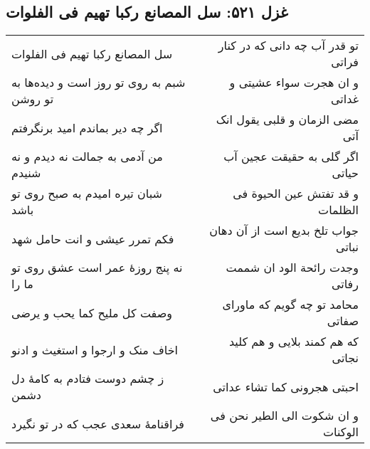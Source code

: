 \begin{center}
\section*{غزل ۵۲۱: سل المصانع رکبا تهیم فی الفلوات}
\label{sec:521}
\begin{longtable}{l p{0.5cm} r}
سل المصانع رکبا تهیم فی الفلوات
&&
تو قدر آب چه دانی که در کنار فراتی
\\
شبم به روی تو روز است و دیده‌ها به تو روشن
&&
و ان هجرت سواء عشیتی و غداتی
\\
اگر چه دیر بماندم امید برنگرفتم
&&
مضی الزمان و قلبی یقول انک آتی
\\
من آدمی به جمالت نه دیدم و نه شنیدم
&&
اگر گلی به حقیقت عجین آب حیاتی
\\
شبان تیره امیدم به صبح روی تو باشد
&&
و قد تفتش عین الحیوة فی الظلمات
\\
فکم تمرر عیشی و انت حامل شهد
&&
جواب تلخ بدیع است از آن دهان نباتی
\\
نه پنج روزهٔ عمر است عشق روی تو ما را
&&
وجدت رائحة الود ان شممت رفاتی
\\
وصفت کل ملیح کما یحب و یرضی
&&
محامد تو چه گویم که ماورای صفاتی
\\
اخاف منک و ارجوا و استغیث و ادنو
&&
که هم کمند بلایی و هم کلید نجاتی
\\
ز چشم دوست فتادم به کامهٔ دل دشمن
&&
احبتی هجرونی کما تشاء عداتی
\\
فراقنامهٔ سعدی عجب که در تو نگیرد
&&
و ان شکوت الی الطیر نحن فی الوکنات
\\
\end{longtable}
\end{center}
